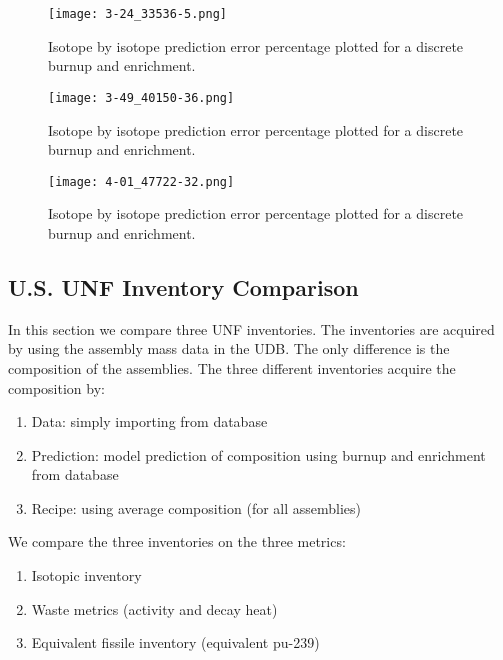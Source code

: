 \begin{figure}
    \centering
    \texttt{[image: 3-24\_33536-5.png]}
    \caption{Isotope by isotope prediction error percentage
             plotted for a discrete burnup and enrichment.
             }
    \label{fig:324_33536}
\end{figure}



\begin{figure}
    \centering
    \texttt{[image: 3-49\_40150-36.png]}
    \caption{Isotope by isotope prediction error percentage
             plotted for a discrete burnup and enrichment.
             }
    \label{fig:349_40150}
\end{figure}


\begin{figure}
    \centering
    \texttt{[image: 4-01\_47722-32.png]}
    \caption{Isotope by isotope prediction error percentage
             plotted for a discrete burnup and enrichment.
             }
    \label{fig:401_47722}
\end{figure}


\subsection{U.S. \gls{UNF} Inventory Comparison}

In this section we compare three \gls{UNF} inventories.
The inventories are acquired by using the assembly mass data
in the \gls{UDB}. The only difference is the composition of the
assemblies. The three different inventories acquire the composition by:

\begin{enumerate}
    \item Data: simply importing from database
    \item Prediction: model prediction of composition using burnup and enrichment from database
    \item Recipe: using average composition (for all assemblies)
\end{enumerate}

We compare the three inventories on the three
metrics:
\begin{enumerate}
    \item Isotopic inventory
    \item Waste metrics (activity and decay heat)
    \item Equivalent fissile inventory (equivalent pu-239)
\end{enumerate}

